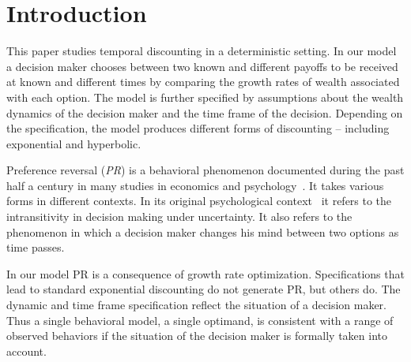 \documentclass[11pt]{article}
\numberwithin{equation}{section}
\begin{document}
\begin{titlepage}
\begin{abstract}
\bigskip
\end{abstract}
\setcounter{page}{0}
\thispagestyle{empty}
\end{titlepage}
\pagebreak \newpage

\section{Introduction}\label{sec:introduction}

This paper studies temporal discounting in a deterministic setting. In our model a decision maker chooses between two known and different payoffs to be received at known and different times by comparing the growth rates of wealth associated with each option. The model is further specified by assumptions about the wealth dynamics of the decision maker and the time frame of the decision. Depending on the specification, the model produces different forms of discounting -- including exponential and hyperbolic.

Preference reversal (\textit{PR}) is a behavioral phenomenon documented during the past half a century in many studies in economics and psychology~\citep{lichtenstein1971reversals,lindman1971inconsistent,grether1979economic,loomes1983rationale,tversky1990causes,ainslie1992picoeconomics,laibson1997golden}. It takes various forms in different contexts. In its original psychological context~\citep{tversky1969intransitivity,lichtenstein1971reversals} it refers to the intransitivity in decision making under uncertainty. It also refers to the phenomenon in which a decision maker changes his mind between two options as time passes. 

In our model PR is a consequence of growth rate optimization. Specifications that lead to standard exponential discounting do not generate PR, but others do. The dynamic and time frame specification reflect the situation of a decision maker. Thus a single behavioral model,
a single optimand, is consistent with a range of observed behaviors if the situation of the decision maker is formally taken into account.

\end{document}
